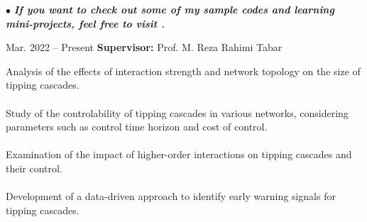 \documentclass[9pt, purple]{./template/cv} %
\begin{document}
% 


$\bullet$ \textbf{\textit{If you want to check out some of my sample codes and learning mini-projects, feel free to visit .}}

\vspace{4mm}

\begin{entrylist}
        
	\entry
	{Mar. 2022 -- Present}
	{
         \textbf{Supervisor:} Prof. M. Reza Rahimi Tabar \\
        }
	{}
	{
		\begin{minipage}[t]{0.80\textwidth} %
			\vspace{-\baselineskip}
			\itemmarker Analysis of the effects of interaction strength and network topology on the size of tipping cascades.\\
			\vspace{-3mm}\\
			\itemmarker Study of the controlability of tipping cascades in various networks, considering parameters such as control time horizon and cost of control.\\
			\vspace{-3mm}\\
			\itemmarker Examination of the impact of higher-order interactions on tipping cascades and their control. \\
                \vspace{-3mm}\\
			\itemmarker Development of a data-driven approach to identify early warning signals for tipping cascades. \\
		\end{minipage}
  
}
\end{entrylist}
\end{document}
